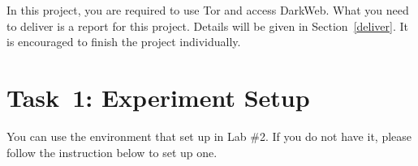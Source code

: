 \documentclass[11pt]{article}
\newcommand{\tor}{{\sf Tor}\xspace}
\newcommand{\darkweb}{{\sf DarkWeb}\xspace}
\begin{document}
In this project, you are required to use \tor and access \darkweb.   What you need to deliver is a report for this project. Details will be given in Section~\ref{deliver}. It is encouraged to finish the project individually.




\section{Task~1: Experiment Setup}
 
You can use the environment that set up in Lab \#2. If you do not have it, please follow the instruction below to set up one. 
\end{document}
